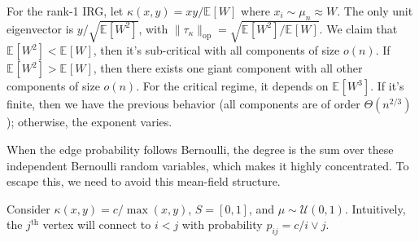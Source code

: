 \begin{eg}
	For the rank-1 IRG, let \(\kappa (x, y) = xy / \mathbb{E}_{}[W] \) where \(x_i \sim \mu _n \approx W\). The only unit eigenvector is \(y / \sqrt{\mathbb{E}_{}[W^2] } \), with \(\lVert \tau _{\kappa } \rVert _{\mathrm{op} }= \sqrt{\mathbb{E}_{}[W^2] / \mathbb{E}_{}[W] } \). We claim that \(\mathbb{E}_{}[W^2] < \mathbb{E}_{}[W] \), then it's sub-critical with all components of size \(o(n)\). If \(\mathbb{E}_{}[W^2] > \mathbb{E}_{}[W] \), then there exists one giant component with all other components of size \(o(n)\). For the critical regime, it depends on \(\mathbb{E}_{}[W^3] \). If it's finite, then we have the previous behavior (all components are of order \(\Theta (n^{2 / 3})\)); otherwise, the exponent varies.
\end{eg}

\begin{remark}
	When the edge probability follows Bernoulli, the degree is the sum over these independent Bernoulli random variables, which makes it highly concentrated. To escape this, we need to avoid this mean-field structure.
\end{remark}

\begin{eg}
	Consider \(\kappa (x, y) = c / \max (x, y)\), \(S = [0, 1]\), and \(\mu \sim \mathcal{U} (0, 1)\). Intuitively, the \(j^{\text{th} }\) vertex will connect to \(i < j\) with probability \(p_{ij} = c / i \vee j\).
\end{eg}